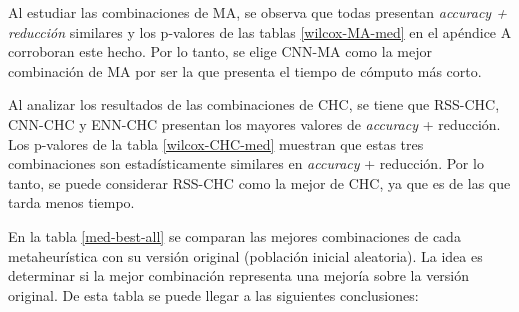 Al estudiar las combinaciones de MA, se observa que todas presentan \emph{accuracy + reducción} similares y los p-valores de las tablas \ref{wilcox-MA-med} en el apéndice A corroboran este hecho. Por lo tanto, se elige CNN-MA como la mejor combinación de MA por ser la que presenta el tiempo de cómputo más corto.

Al analizar los resultados de las combinaciones de CHC, se tiene que RSS-CHC, CNN-CHC y ENN-CHC presentan los mayores valores de \emph{accuracy} + reducción. Los p-valores de la tabla \ref{wilcox-CHC-med} muestran que estas tres combinaciones son estadísticamente similares en \emph{accuracy} + reducción. Por lo tanto, se puede considerar RSS-CHC como la mejor de CHC, ya que es de las que tarda menos tiempo.

En la tabla \ref{med-best-all} se comparan las mejores combinaciones de cada metaheurística con su versión original (población inicial aleatoria). La idea es determinar si la mejor combinación representa una mejoría sobre la versión original. De esta tabla se puede llegar a las siguientes conclusiones:

